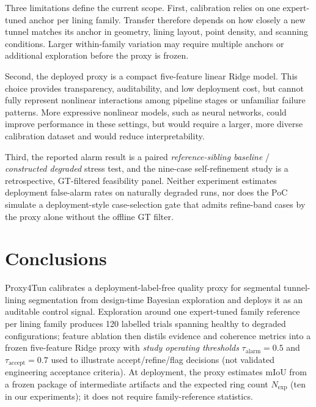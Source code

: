 \documentclass[a4paper,fleqn]{cas-dc}
\begin{document}
{Three limitations define the current scope. First, calibration relies on one
expert-tuned anchor per lining family. Transfer therefore depends on how
closely a new tunnel matches its anchor in geometry, lining layout, point
density, and scanning conditions. Larger within-family variation may require
multiple anchors or additional exploration before the proxy is frozen.

Second, the deployed proxy is a compact five-feature linear Ridge model. This
choice provides transparency, auditability, and low deployment cost, but cannot
fully represent nonlinear interactions among pipeline stages or unfamiliar
failure patterns. More expressive nonlinear models, such as neural networks,
could improve performance in these settings, but would require a larger,
more diverse calibration dataset and would reduce interpretability.

Third, the reported alarm result is a paired \emph{reference-sibling baseline} / \emph{constructed degraded} stress test, and the nine-case self-refinement study is a retrospective, GT-filtered feasibility panel. Neither experiment estimates deployment false-alarm rates on naturally degraded runs, nor does the PoC simulate a deployment-style case-selection gate that admits refine-band cases by the proxy alone without the offline GT filter.

\section{Conclusions}\label{sec:conclusions}

Proxy4Tun calibrates a deployment-label-free quality proxy for segmental tunnel-lining segmentation from design-time Bayesian exploration and deploys it as an auditable control signal. Exploration around one expert-tuned family reference per lining family produces 120 labelled trials spanning healthy to degraded configurations; feature ablation then distils evidence and coherence metrics into a frozen five-feature Ridge proxy with \emph{study operating thresholds} $\tau_{\mathrm{alarm}}=0.5$ and $\tau_{\mathrm{accept}}=0.7$ used to illustrate accept/refine/flag decisions (not validated engineering acceptance criteria). At deployment, the proxy estimates mIoU from a frozen package of intermediate artifacts and the expected ring count $N_{\mathrm{exp}}$ (ten in our experiments); it does not require family-reference statistics.

}
\end{document}
